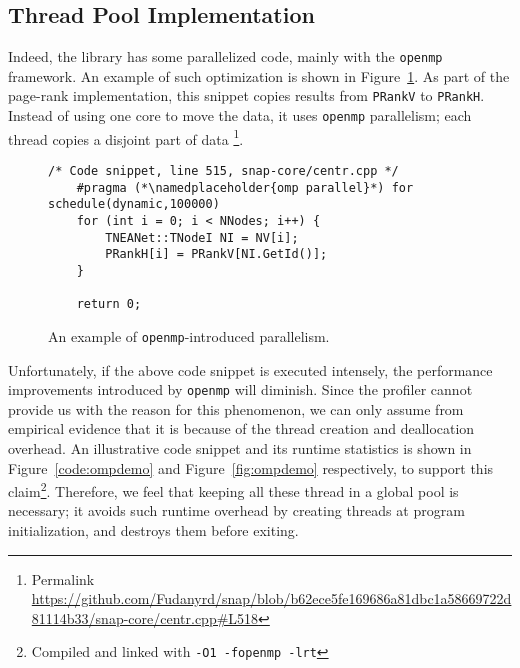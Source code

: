 \subsection{Thread Pool Implementation}

\par Indeed, the \snap library has some parallelized code, mainly 
with the \texttt{openmp} framework\citep{openmp,embedded-hps}. An example
of such optimization is shown in Figure~\ref{code:openmp}. As part of the page-rank
implementation, this snippet copies results from \texttt{PRankV} to \texttt{PRankH}.
Instead of using one core to move the data, it uses \texttt{openmp} parallelism; 
each  thread copies a disjoint part of data
\footnote{Permalink 
\url{https://github.com/Fudanyrd/snap/blob/b62ece5fe169686a81dbc1a58669722d81114b33/snap-core/centr.cpp\#L518}}.

\begin{figure}[ht]
    \centering
\begin{lstlisting}[frame=tlbr]
    /* Code snippet, line 515, snap-core/centr.cpp */
    #pragma (*\namedplaceholder{omp parallel}*) for schedule(dynamic,100000)
    for (int i = 0; i < NNodes; i++) {
        TNEANet::TNodeI NI = NV[i];
        PRankH[i] = PRankV[NI.GetId()];
    }

    return 0;
\end{lstlisting}
    \caption{An example of \texttt{openmp}-introduced parallelism.}
    \label{code:openmp}
\end{figure}

\par Unfortunately, if the above code snippet is executed intensely, the 
performance improvements introduced by \texttt{openmp} will diminish. Since 
the profiler cannot provide us with the reason for this phenomenon, we can
only assume from empirical evidence that it is because of the thread creation 
and deallocation overhead. An illustrative code snippet and its runtime
statistics is shown in Figure~\ref{code:ompdemo} and Figure~\ref{fig:ompdemo} respectively,
to support this claim\footnote{Compiled and linked with \texttt{-O1 -fopenmp -lrt}}.
Therefore, we feel that keeping all these thread in a global pool is necessary;
it avoids such runtime overhead by creating threads at program initialization,
and destroys them before exiting.

